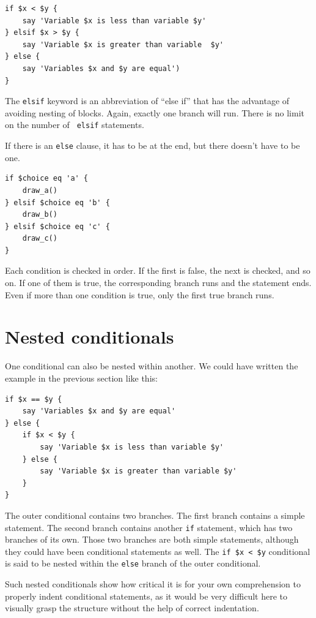 \begin{verbatim}
if $x < $y {
    say 'Variable $x is less than variable $y'
} elsif $x > $y {
    say 'Variable $x is greater than variable  $y' 
} else {
    say 'Variables $x and $y are equal')
}
\end{verbatim}
%
The {\tt elsif} keyword is an abbreviation of ``else if'' that 
has the advantage of avoiding nesting of blocks. Again, exactly one
branch will run.  There is no limit on the number of {\tt
elsif} statements.  

If there is an {\tt else} clause, it has to be
at the end, but there doesn't have to be one.

\begin{verbatim}
if $choice eq 'a' {
    draw_a()
} elsif $choice eq 'b' {
    draw_b()
} elsif $choice eq 'c' {
    draw_c()
}
\end{verbatim}
%
Each condition is checked in order.  If the first is false,
the next is checked, and so on.  If one of them is
true, the corresponding branch runs and the statement
ends.  Even if more than one condition is true, only the
first true branch runs.  


\section{Nested conditionals}

One conditional can also be nested within another.  We could have
written the example in the previous section like this:

\begin{verbatim}
if $x == $y {
    say 'Variables $x and $y are equal'
} else {
    if $x < $y {
        say 'Variable $x is less than variable $y'
    } else {
        say 'Variable $x is greater than variable $y'
    }
}
\end{verbatim}
%
The outer conditional contains two branches.  The
first branch contains a simple statement.  The second branch
contains another {\tt if} statement, which has two branches of its
own.  Those two branches are both simple statements,
although they could have been conditional statements as well. 
The \verb'if $x < $y' conditional is said to be nested within 
the {\tt else} branch of the outer conditional.

Such nested conditionals show how critical it is for your 
own comprehension to properly indent conditional statements, 
as it would be very difficult here to visually grasp the 
structure without the help of correct indentation.

